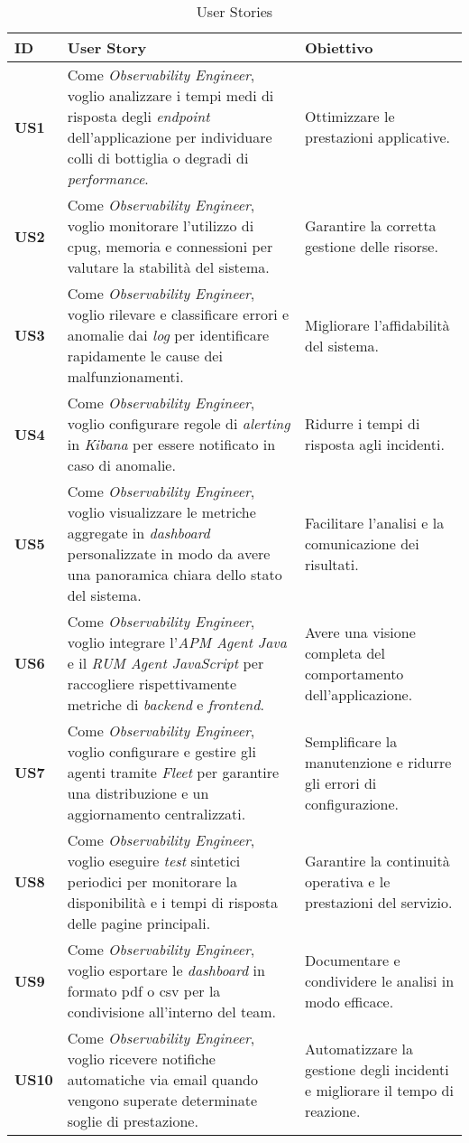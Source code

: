\centering
\begin{longtable}{|p{1cm}|p{8cm}|p{3cm}|}
\caption{User Stories}
\label{tab:user-stories} \\
\hline
\rowcolor[gray]{0.8}
\textbf{ID} & \textbf{User Story} & \textbf{Obiettivo} \\
\hline
\endfirsthead

\hline
\textbf{US1} & Come \emph{Observability Engineer}, voglio analizzare i tempi medi di risposta degli \emph{endpoint} dell'applicazione per individuare colli di bottiglia o degradi di \emph{performance}. & Ottimizzare le prestazioni applicative. \\
\hline
\textbf{US2} & Come \emph{Observability Engineer}, voglio monitorare l'utilizzo di \gls{cpug}, memoria e connessioni per valutare la stabilità del sistema. & Garantire la corretta gestione delle risorse. \\
\hline
\textbf{US3} & Come \emph{Observability Engineer}, voglio rilevare e classificare errori e anomalie dai \emph{log} per identificare rapidamente le cause dei malfunzionamenti. & Migliorare l'affidabilità del sistema. \\
\hline
\textbf{US4} & Come \emph{Observability Engineer}, voglio configurare regole di \emph{alerting} in \emph{Kibana} per essere notificato in caso di anomalie. & Ridurre i tempi di risposta agli incidenti. \\
\hline
\textbf{US5} & Come \emph{Observability Engineer}, voglio visualizzare le metriche aggregate in \emph{dashboard} personalizzate in modo da avere una panoramica chiara dello stato del sistema. & Facilitare l'analisi e la comunicazione dei risultati. \\
\hline
\textbf{US6} & Come \emph{Observability Engineer}, voglio integrare l'\emph{APM Agent Java} e il \emph{RUM Agent JavaScript} per raccogliere rispettivamente metriche di \emph{backend} e \emph{frontend}. & Avere una visione completa del comportamento dell'applicazione. \\
\hline
\textbf{US7} & Come \emph{Observability Engineer}, voglio configurare e gestire gli agenti tramite \emph{Fleet} per garantire una distribuzione e un aggiornamento centralizzati. & Semplificare la manutenzione e ridurre gli errori di configurazione. \\
\hline
\textbf{US8} & Come \emph{Observability Engineer}, voglio eseguire \emph{test} sintetici periodici per monitorare la disponibilità e i tempi di risposta delle pagine principali. & Garantire la continuità operativa e le prestazioni del servizio. \\
\hline
\textbf{US9} & Come \emph{Observability Engineer}, voglio esportare le \emph{dashboard} in formato \gls{pdf} o \gls{csv} per la condivisione all'interno del team. & Documentare e condividere le analisi in modo efficace. \\
\hline
\textbf{US10} & Come \emph{Observability Engineer}, voglio ricevere notifiche automatiche via email quando vengono superate determinate soglie di prestazione. & Automatizzare la gestione degli incidenti e migliorare il tempo di reazione. \\
\hline
\end{longtable}



